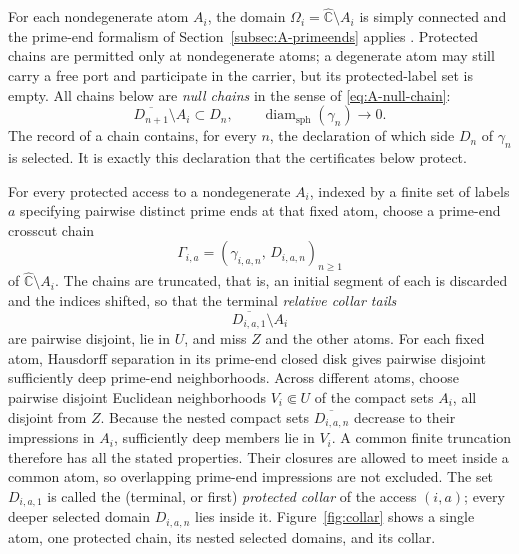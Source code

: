 \documentclass[11pt,reqno]{amsart}
\theoremstyle{definition}
\theoremstyle{remark}
\newcommand{\Chat}{\widehat{\mathbb C}}
\begin{document}
For each nondegenerate atom $A_i$, the domain
$\Omega_i=\Chat\setminus A_i$ is simply connected and the prime-end
formalism of Section~\ref{subsec:A-primeends} applies \cite{Pom92}.
Protected chains are permitted only at nondegenerate atoms; a degenerate
atom may still carry a free port and participate in the carrier, but its
protected-label set is empty.  All chains below are \emph{null chains} in the
sense of
\eqref{eq:A-null-chain}:
\[
 \overline{D_{n+1}}\setminus A_i\subset D_n,
 \qquad
 \operatorname{diam}_{\mathrm{sph}}(\gamma_n)\longrightarrow0.
\]
The record of a chain contains, for every $n$, the declaration of which
side $D_n$ of $\gamma_n$ is selected.  It is exactly this declaration that
the certificates below protect.

For every protected access to a nondegenerate $A_i$, indexed by a finite
set of labels $a$ specifying pairwise distinct prime ends at that fixed
atom, choose a prime-end crosscut chain
\[
\Gamma_{i,a}=(\gamma_{i,a,n},\,D_{i,a,n})_{n\ge1}
\]
of $\Chat\setminus A_i$.  The chains are truncated, that is, an initial
segment of each is discarded and the indices shifted, so that the terminal
\emph{relative collar tails}
\[
\overline{D_{i,a,1}}\setminus A_i
\]
are pairwise disjoint, lie in $U$, and miss $Z$ and the other atoms.  For
each fixed atom, Hausdorff separation in its prime-end closed disk gives
pairwise disjoint sufficiently deep prime-end neighborhoods.  Across
different atoms, choose pairwise disjoint Euclidean neighborhoods
$V_i\Subset U$ of the compact sets $A_i$, all disjoint from $Z$.
Because the nested compact sets $\overline{D_{i,a,n}}$ decrease to their
impressions in $A_i$, sufficiently deep members lie in $V_i$.  A common
finite truncation therefore has all the stated properties.  Their closures are allowed
to meet inside a common atom, so overlapping prime-end impressions are not
excluded.  The set $D_{i,a,1}$ is called the (terminal, or first)
\emph{protected collar} of the access $(i,a)$; every deeper selected domain
$D_{i,a,n}$ lies inside it.  Figure~\ref{fig:collar} shows a single atom,
one protected chain, its nested selected domains, and its collar.
\end{document}
